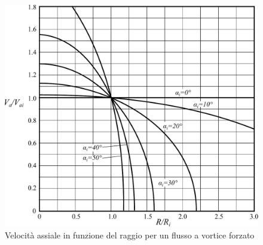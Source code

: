 \begin{figure}
\centering
  \includegraphics[width=\textwidth]{fig/VortForz.pdf}
\caption{Velocità assiale in funzione del raggio per un flusso a vortice forzato}
\label{fig:TurboFan}
\end{figure}


